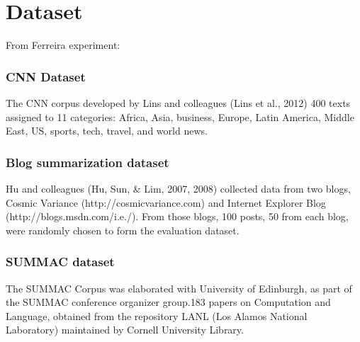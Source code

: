 \documentclass[conference]{IEEEtran}
\begin{document}
\section{Dataset}
From Ferreira \cite{Ferreira} experiment:
\subsubsection{CNN Dataset} The CNN corpus developed by Lins and colleagues (Lins et al., 2012)  400 texts assigned to 11 categories: Africa, Asia, business, Europe, Latin America, Middle East, US, sports, tech, travel, and world news.
\subsubsection{Blog summarization dataset} Hu and colleagues (Hu, Sun, \& Lim, 2007, 2008) collected data from two blogs, Cosmic Variance (http://cosmicvariance.com) and Internet Explorer Blog (http://blogs.msdn.com/i.e./). From those blogs, 100 posts, 50 from each blog, were randomly chosen to form the evaluation dataset.
\subsubsection{SUMMAC dataset} The SUMMAC Corpus was elaborated with University of Edinburgh, as part of the SUMMAC conference organizer group.183 papers on Computation and Language, obtained from the repository LANL (Los Alamos National Laboratory) maintained by Cornell University Library.
\end{document}
